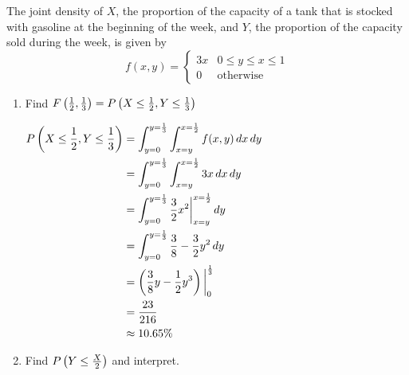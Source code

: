\begin{example}
    The joint density of $X$, the proportion of the capacity of a tank that is stocked with gasoline at the beginning of the week, and $Y$, the proportion of the capacity sold during the week, is given by $$f(x, y) = \begin{cases} 3x & 0 \le y \le x \le 1 \\ 0 & \text{otherwise} \end{cases}$$


    \begin{enumerate}[label=\alph*)]
        \item Find $F\left(\frac{1}{2}, \frac{1}{3}\right) = P\left(X \le \frac{1}{2}, Y \le \frac{1}{3}\right)$
        
        $\begin{aligned}[t]
            P\left(X \le \frac{1}{2}, Y \le \frac{1}{3}\right) & = \int_{y=0}^{y=\frac{1}{3}} \int_{x=y}^{x=\frac{1}{2}} f(x, y) \,dx \,dy      \\
                                                            & = \int_{y=0}^{y=\frac{1}{3}} \int_{x=y}^{x=\frac{1}{2}} 3x \,dx \,dy           \\
                                                            & = \int_{y=0}^{y=\frac{1}{3}} \frac{3}{2} x^2 \bigg|_{x=y}^{x=\frac{1}{2}} \,dy \\
                                                            & = \int_{y=0}^{y=\frac{1}{3}} \frac{3}{8} - \frac{3}{2} y^2 \,dy                \\
                                                            & = \left(\frac{3}{8}y - \frac{1}{2} y^3\right) \bigg|_0^\frac{1}{3}                \\
                                                            & = \frac{23}{216}                                                               \\
                                                            & \approx 10.65\%
        \end{aligned}$


        \item Find $P\left(Y \le \frac{X}{2}\right)$ and interpret. 



\end{enumerate}
\end{example}
